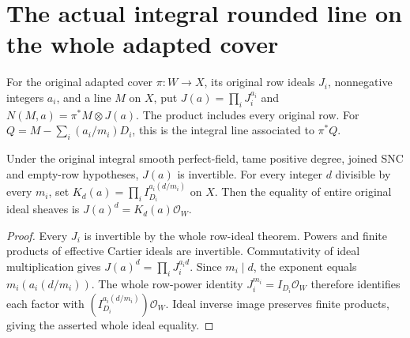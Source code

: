 \section{The actual integral rounded line on the whole adapted cover}

\begin{definition}
\label{def:kn-nadel-whole-rounded-root-line}
\leanok
For the original adapted cover $\pi:W\to X$, its original row ideals
$J_i$, nonnegative integers $a_i$, and a line $M$ on $X$, put
$J(a)=\prod_iJ_i^{a_i}$ and $N(M,a)=\pi^*M\otimes J(a)$.
The product includes every original row. For
$Q=M-\sum_i(a_i/m_i)D_i$, this is the integral line associated to
$\pi^*Q$.
\end{definition}

\begin{lemma}
\label{lem:kn-nadel-whole-rounded-root-power}
\leanok
{}
Under the original integral smooth perfect-field, tame positive degree,
joined SNC and empty-row hypotheses, $J(a)$ is invertible. For every
integer $d$ divisible by every $m_i$, set
$K_d(a)=\prod_i I_{D_i}^{a_i(d/m_i)}$ on $X$. Then the equality of
entire original ideal sheaves is $J(a)^d=K_d(a)\mathcal O_W$.
\end{lemma}
\begin{proof}
Every $J_i$ is invertible by the whole row-ideal theorem. Powers and
finite products of effective Cartier ideals are invertible. Commutativity
of ideal multiplication gives
$J(a)^d=\prod_iJ_i^{a_id}$. Since $m_i\mid d$, the exponent equals
$m_i(a_i(d/m_i))$. The whole row-power identity
$J_i^{m_i}=I_{D_i}\mathcal O_W$ therefore identifies each factor with
$(I_{D_i}^{a_i(d/m_i)})\mathcal O_W$. Ideal inverse image preserves
finite products, giving the asserted whole ideal equality.
\end{proof}

